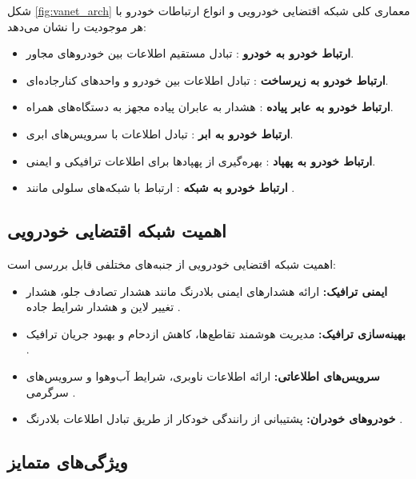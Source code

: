 \documentclass[12pt,a4paper]{article}
\begin{document}
شکل \ref{fig:vanet_arch} معماری کلی شبکه اقتضایی خودرویی و انواع ارتباطات خودرو با هر موجودیت  را نشان می‌دهد:

\begin{itemize}
  \item \textbf{ارتباط خودرو به خودرو }: تبادل مستقیم اطلاعات بین خودروهای مجاور.
  \item \textbf{ارتباط خودرو به زیرساخت }: تبادل اطلاعات بین خودرو و واحدهای کنارجاده‌ای.
  \item \textbf{ارتباط خودرو به عابر پیاده }: هشدار به عابران پیاده مجهز به دستگاه‌های همراه.
  \item \textbf{ارتباط خودرو به ابر }: تبادل اطلاعات با سرویس‌های ابری.
  \item \textbf{ارتباط خودرو به پهپاد }: بهره‌گیری از پهپادها برای اطلاعات ترافیکی و ایمنی.
  \item \textbf{ارتباط خودرو به شبکه }: ارتباط با شبکه‌های سلولی مانند .
\end{itemize}

\subsection{اهمیت شبکه اقتضایی خودرویی}

اهمیت شبکه اقتضایی خودرویی از جنبه‌های مختلفی قابل بررسی است:

\begin{itemize}
  \item \textbf{ایمنی ترافیک:} ارائه هشدارهای ایمنی بلادرنگ مانند هشدار تصادف جلو، هشدار تغییر لاین و هشدار شرایط جاده \cite{hozouriOverviewVANETVehicular2023}.
  \item \textbf{بهینه‌سازی ترافیک:} مدیریت هوشمند تقاطع‌ها، کاهش ازدحام و بهبود جریان ترافیک \cite{xuInternetVehiclesBig2018}.
  \item \textbf{سرویس‌های اطلاعاتی:} ارائه اطلاعات ناوبری، شرایط آب‌وهوا و سرویس‌های سرگرمی \cite{hozouriOverviewVANETVehicular2023}.
  \item \textbf{خودروهای خودران:} پشتیبانی از رانندگی خودکار از طریق تبادل اطلاعات بلادرنگ \cite{xuInternetVehiclesBig2018}.
\end{itemize}

\subsection{ویژگی‌های متمایز}
\end{document}
